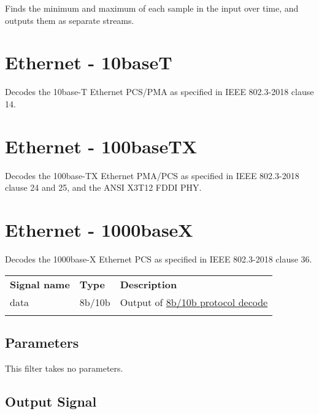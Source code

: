 Finds the minimum and maximum of each sample in the input over time, and outputs them as separate streams.

\pagebreak
\section{Ethernet - 10baseT}

Decodes the 10base-T Ethernet PCS/PMA as specified in IEEE 802.3-2018 clause 14.

\pagebreak
\section{Ethernet - 100baseTX}

Decodes the 100base-TX Ethernet PMA/PCS as specified in IEEE 802.3-2018 clause 24 and 25, and the ANSI X3T12 FDDI PHY.

\pagebreak
\section{Ethernet - 1000baseX}
\label{filter:1000basex}

Decodes the 1000base-X Ethernet PCS as specified in IEEE 802.3-2018 clause 36.

\begin{tabularx}{16cm}{llX}
\thickhline
\textbf{Signal name} & \textbf{Type} & \textbf{Description} \\
\thickhline
data & 8b/10b & Output of \hyperref[proto:8b10b]{8b/10b protocol decode}\\
\thickhline
\end{tabularx}

\subsection{Parameters}

This filter takes no parameters.

\subsection{Output Signal}

